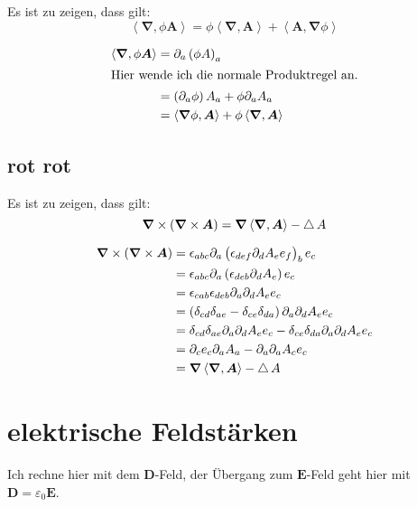 \documentclass[11pt, ngerman]{article}
\newcommand{\divergence}[1]{\inner{\vnabla}{#1}}
\newcommand{\inner}[2]{\left\langle #1, #2 \right\rangle}
\newcommand{\laplace}{\mathop{{}\bigtriangleup}\nolimits}
\newcommand{\vnabla}{\vec \nabla}
\renewcommand{\vec}[1]{\boldsymbol{#1}}
\begin{document}
Es ist zu zeigen, dass gilt:
\[ \divergence{\phi \vec A} = \phi \divergence{\vec A} + \inner{\vec A}{\vnabla \phi} \]

\begin{align*}
	\divergence{\phi \vec A}
	&= \partial_a \del{\phi A}_a \\
	\intertext{Hier wende ich die normale Produktregel an.}
	&= \del{\partial_a \phi} A_a + \phi \partial_a A_a \\
	&= \inner{\vnabla \phi}{\vec A} + \phi \divergence{\vec A}
\end{align*}

\subsection{rot rot}

Es ist zu zeigen, dass gilt:
\[ \vnabla \times \del{\vnabla \times \vec A} = \vnabla \divergence{\vec A} - \laplace A \]

\begin{align*}
	\vnabla \times \del{\vnabla \times \vec A}
	&= \epsilon_{abc} \partial_a \del{\epsilon_{def} \partial_d A_e e_f}_b e_c \\
	&= \epsilon_{abc} \partial_a \del{\epsilon_{deb} \partial_d A_e} e_c \\
	&= \epsilon_{cab} \epsilon_{deb} \partial_a \partial_d A_e e_c \\
	&= \del{\delta_{cd} \delta_{ae} - \delta_{ce} \delta_{da}} \partial_a \partial_d A_e e_c \\
	&= \delta_{cd} \delta_{ae} \partial_a \partial_d A_e e_c - \delta_{ce} \delta_{da} \partial_a \partial_d A_e e_c \\
	&= \partial_c e_c \partial_a A_a - \partial_a \partial_a A_c e_c \\
	&= \vnabla \divergence{\vec A} - \laplace A
\end{align*}


\section{elektrische Feldstärken}

Ich rechne hier mit dem $\vec D$-Feld, der Übergang zum $\vec E$-Feld geht hier
mit $\vec D = \varepsilon_0 \vec E$.
\end{document}
